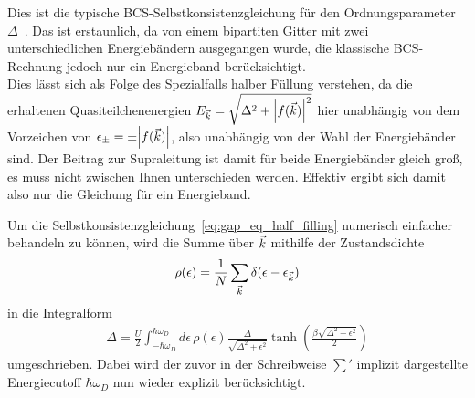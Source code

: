 Dies ist die typische BCS-Selbstkonsistenzgleichung für den Ordnungsparameter $\Delta$~\cite{czycholl_theoretische_2017}. 
Das ist erstaunlich, da von einem bipartiten Gitter mit zwei unterschiedlichen Energiebändern ausgegangen wurde, die klassische BCS-Rechnung jedoch nur ein Energieband berücksichtigt. \\
Dies lässt sich als Folge des Spezialfalls halber Füllung verstehen, da die erhaltenen Quasiteilchenenergien $E_{\vec{k}} = \sqrt{\Delta^2 + \abs{f({\vec{k}})}^2}$ hier unabhängig von dem Vorzeichen von $\epsilon_\pm = \pm \abs{f({\vec{k}})}$, also unabhängig von der Wahl der Energiebänder sind. 
Der Beitrag zur Supraleitung ist damit für beide Energiebänder gleich groß, es muss nicht zwischen Ihnen unterschieden werden.
Effektiv ergibt sich damit also nur die Gleichung für ein Energieband.

Um die Selbstkonsistenzgleichung~\eqref{eq:gap_eq_half_filling} numerisch einfacher behandeln zu können, wird die Summe über ${\vec{k}}$ mithilfe der Zustandsdichte 
\begin{align}
    \rho(\epsilon) = \frac{1}{N} \sum_{\vec{k}} \delta(\epsilon - \epsilon_{\vec{k}})
\end{align}
in die Integralform
\begin{align}
    \Delta = \frac{U}{2} \int_{-\hbar \omega_D}^{\hbar \omega_D} d\epsilon \, \rho(\epsilon) \frac{\Delta}{\sqrt{\Delta^2 + \epsilon^2}} \tanh\left(\frac{\beta \sqrt{\Delta^2 + \epsilon^2}}{2}\right) \label{eq:gap_eq_half_filling_integral}
\end{align}
umgeschrieben. 
Dabei wird der zuvor in der Schreibweise $\sum'$ implizit dargestellte Energiecutoff $\hbar \omega_D$ nun wieder explizit berücksichtigt.

